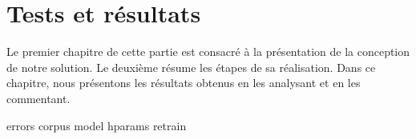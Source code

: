 \chapter{Tests et résultats}%
\label{chap.results}

Le premier chapitre de cette partie est consacré à la présentation de la conception de notre solution.
Le deuxième résume les étapes de sa réalisation.
Dans ce chapitre, nous présentons les résultats obtenus en les analysant et en les commentant.

{errors}
{corpus}
{model}
{hparams}
{retrain}